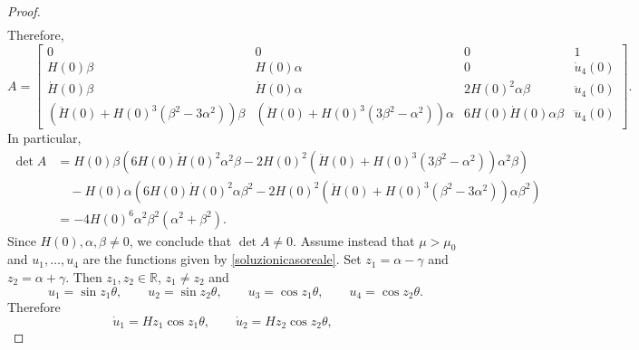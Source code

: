 \documentclass[10pt,a4paper]{amsart}
\newcommand{\rr}{{\mathbb{R}}}
\begin{document}
\begin{proof}
\begin{align*}
\end{align*}
Therefore, 
\begin{equation*}
A=\begin{bmatrix}
	0 & 0 & 0 & 1 \\
	H(0)\beta & H(0)\alpha & 0 & \dot u_4(0) \\
	\dot H(0)\beta & \dot H(0)\alpha & 2H(0)^2\alpha\beta & \ddot u_4(0) \\
	\left(\ddot H(0)+H(0)^3\left(\beta^2-3\alpha^2\right)\right)\beta & \left(\ddot H(0)+H(0)^3\left(3\beta^2-\alpha^2\right)\right)\alpha & 6H(0)\dot H(0)\alpha\beta & \dddot u_4(0)
\end{bmatrix}.
\end{equation*}
In particular,
\begin{equation*}
\begin{split}
	\det A&=H(0)\beta\left(6H(0)\dot H(0)^2\alpha^2\beta-2H(0)^2\left(\ddot H(0)+H(0)^3\left(3\beta^2-\alpha^2\right)\right)\alpha^2\beta\right)\\
	&\quad-H(0)\alpha\left(6H(0)\dot H(0)^2\alpha\beta^2-2H(0)^2\left(\ddot H(0)+H(0)^3\left(\beta^2-3\alpha^2\right)\right)\alpha\beta^2\right)\\
	&=-4H(0)^6\alpha^2\beta^2\left(\alpha^2+\beta^2\right).
\end{split}
\end{equation*}
Since $H(0),\alpha,\beta\neq 0$, we conclude that $\det A\neq 0$.
Assume instead that $\mu>\mu_0$ and $u_1,\ldots,u_4$ are the functions given by \eqref{soluzionicasoreale}. 
Set $z_1=\alpha-\gamma$ and $z_2=\alpha+\gamma$. %
Then $z_1,z_2\in\rr$, $z_1\neq z_2$ and
\begin{equation*}
u_1=\sin z_1 \theta,\qquad
u_2=\sin z_2\theta,\qquad
u_3= \cos z_1 \theta,\qquad
u_4=\cos z_2\theta.
\end{equation*}
Therefore
\begin{equation*}
\dot u_1=Hz_1\cos z_1 \theta,\qquad
\dot u_2=Hz_2\cos z_2\theta,\qquad

\end{equation*}
\end{proof}
\end{document}
